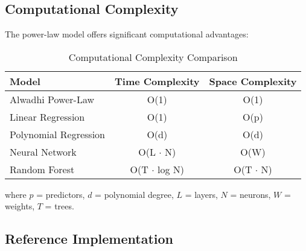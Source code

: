 \documentclass[12pt,a4paper]{article}
\begin{document}
\subsection{Computational Complexity}

The power-law model offers significant computational advantages:

\begin{table}[H]
\centering
\caption{Computational Complexity Comparison}
\begin{tabular}{lcc}
\toprule
\textbf{Model} & \textbf{Time Complexity} & \textbf{Space Complexity} \\
\midrule
Alwadhi Power-Law & O(1) & O(1) \\
Linear Regression & O(1) & O(p) \\
Polynomial Regression & O(d) & O(d) \\
Neural Network & O(L $\cdot$ N) & O(W) \\
Random Forest & O(T $\cdot$ log N) & O(T $\cdot$ N) \\
\bottomrule
\end{tabular}
\end{table}

where $p$ = predictors, $d$ = polynomial degree, $L$ = layers, $N$ = neurons, $W$ = weights, $T$ = trees.

\subsection{Reference Implementation}
\end{document}
